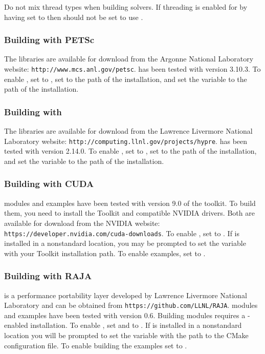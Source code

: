 \noindent Do not mix thread types when building {\sundials} solvers.
If threading is enabled for {\sundials} by having  set to 
then {\superludist} should not be set to use {\openmp}.{\warn}

\subsubsection*{Building with PETSc}
The {\petsc} libraries are available for download from the Argonne National Laboratory website:
{\tt http://www.mcs.anl.gov/petsc}.
{\sundials} has been tested with {\petsc} version 3.10.3.
To enable {\petsc}, set   to , set 
to the  path of the {\petsc} installation, and set the variable
 to the  path of the {\petsc} installation.


\subsubsection*{Building with {\hypre}}
The {\hypre} libraries are available for download from the Lawrence Livermore
National Laboratory website: {\tt http://computing.llnl.gov/projects/hypre}.
{\sundials} has been tested with {\hypre} version 2.14.0.
To enable {\hypre}, set   to , set 
to the  path of the {\hypre} installation, and set the variable
 to the  path of the {\hypre} installation.

\subsubsection*{Building with CUDA}
{\sundials} {\cuda} modules and examples have been tested with version 9.0 of the
{\cuda} toolkit. To build them, you need to install the Toolkit and compatible
NVIDIA drivers. Both are available for download from the NVIDIA website:
{\tt https://developer.nvidia.com/cuda-downloads}. To enable {\cuda},
set  to . If {\cuda} is installed in a
nonstandard location, you may be prompted to set the variable
 with your {\cuda} Toolkit installation
path. To enable {\cuda} examples, set  to .

\subsubsection*{Building with RAJA}
{\raja} is a performance portability layer developed by Lawrence
Livermore National Laboratory and can be obtained from {\tt https://github.com/LLNL/RAJA}.
{\sundials} {\raja} modules and examples have been tested with {\raja}
version 0.6. Building {\sundials} {\raja} modules requires a
{\cuda}-enabled {\raja} installation. To enable {\raja}, set
 and  to . If {\raja} is
installed in a nonstandard location you will be prompted to set the
variable  with the path to the {\raja} CMake
configuration file. To enable building the {\raja} examples set
 to .

